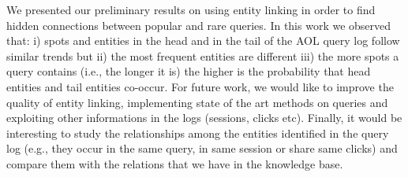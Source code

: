We presented our preliminary results on using entity linking in order
to find hidden connections between popular and rare queries. 
In this work we observed that: i) spots and entities 
in the head and in the tail of the AOL query log follow similar trends but ii) 
the most frequent entities are different iii) the more spots a query contains 
(i.e., the longer it is) the higher is the probability that head entities and
tail entities co-occur. For future work, we would like to improve the quality 
of entity linking, implementing state of the art methods on queries and
exploiting other informations in the logs (sessions, clicks etc). Finally, it
would be interesting to study the relationships among the entities identified in
the query log (e.g., they occur in the same query, in same session or share same
clicks) and compare them with the relations that we have in the knowledge base.
